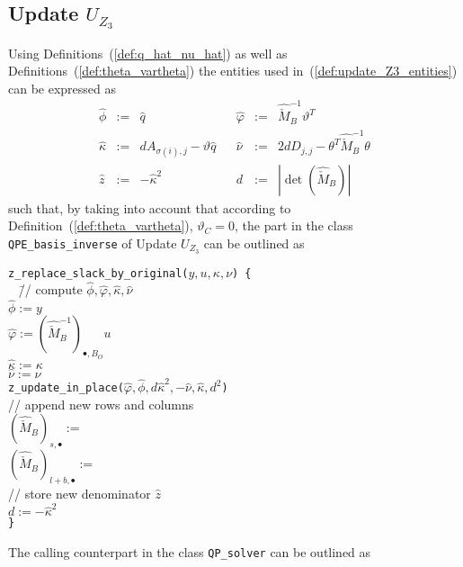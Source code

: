 \documentclass[a4paper]{article}
\begin{document}
\subsection{Update $U_{Z_{3}}$}
Using Definitions~(\ref{def:q_hat_nu_hat}) 
as well as Definitions~(\ref{def:theta_vartheta}) the entities used
in~(\ref{def:update_Z3_entities}) can be expressed as
\begin{equation}
\label{def:update_Z3_entities_prep}
\begin{array}{rclcrcl}
\hat{\phi} &:=& \hat{q}
&&
\hat{\varphi}
&:=&
\hat{\check{M}}_{B}^{-1}\vartheta^{T}
\\
\hat{\kappa} &:=& dA_{\sigma(i), j}-\vartheta\hat{q}
&&
\hat{\nu} &:=& 2dD_{j,j}-\theta^{T}\hat{\check{M}}_{B}^{-1}\theta
\\
\hat{z} &:=& -\hat{\kappa}^{2}
&&
d &:=& \left|\det(\hat{\check{M}}_{B})\right|
\end{array}
\end{equation}
such that, by taking into account that according to
Definition~(\ref{def:theta_vartheta}), $\vartheta_{C}=0$,
the part in the class \texttt{QPE\_basis\_inverse} of
Update $U_{Z_{3}}$ can be outlined as
\begin{tabbing}
\texttt{z\_replace\_slack\_by\_original($y,u,\kappa,\nu$) \{}
\\
\texttt{  } \= // compute $\hat{\phi}, \hat{\varphi}, \hat{\kappa},
\hat{\nu}$ \\
\> \texttt{$\hat{\phi}:=y$} \\
\> \texttt{$\hat{\varphi}:= 
 \left(\hat{\check{M}}_{B}^{-1}\right)_{\bullet, B_{O}}u$} \\
\> \texttt{$\hat{\kappa}:=\kappa$} \\
\> \texttt{$\hat{\nu}:=\nu$} \\
\> \texttt{z\_update\_in\_place($\hat{\varphi}, \hat{\phi},
d\hat{\kappa}^{2}, -\hat{\nu}, \hat{\kappa}, d^{2}$)} \\
\> // append new rows and columns \\
\> $\left(\hat{\check{M}}_{B}\right)_{s, \bullet}:=$ \\
\> $\left(\hat{\check{M}}_{B}\right)_{l+b, \bullet}:=$ \\
\> // store new denominator $\hat{z}$ \\
\> \texttt{$d:=-\hat{\kappa}^{2}$} \\
\texttt{\}}
\end{tabbing}
The calling counterpart in the class \texttt{QP\_solver} can be outlined as
\end{document}
